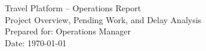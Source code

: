 \documentclass[12pt,a4paper]{report}
\begin{document}
\begin{titlepage}
  \centering
  {\Large Travel Platform – Operations Report\\[6pt]}
  {\large Project Overview, Pending Work, and Delay Analysis}\\[18pt]
  {\normalsize Prepared for: Operations Manager}\\[6pt]
  {\normalsize Date: \today}
\end{titlepage}

\tableofcontents
\clearpage






\end{document}
